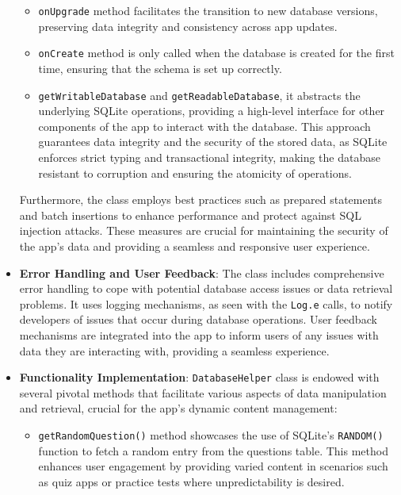 \documentclass[conference,10pt,letterpaper]{IEEEtran}
\begin{document}
\begin{itemize}
		\begin{itemize}
			\item \texttt{onUpgrade} method facilitates the transition to new database versions, preserving data integrity and consistency across app updates.
			
			\item  \texttt{onCreate} method is only called when the database is created for the first time, ensuring that the schema is set up correctly. 
			
			\item \texttt{getWritableDatabase} and \texttt{getReadableDatabase}, it abstracts the underlying SQLite operations, providing a high-level interface for other components of the app to interact with the database. This approach guarantees data integrity and the security of the stored data, as SQLite enforces strict typing and transactional integrity, making the database resistant to corruption and ensuring the atomicity of operations.
		\end{itemize}
		
		Furthermore, the class employs best practices such as prepared statements and batch insertions to enhance performance and protect against SQL injection attacks. These measures are crucial for maintaining the security of the app's data and providing a seamless and responsive user experience.
		
		\item \textbf{Error Handling and User Feedback}:
		The class includes comprehensive error handling to cope with potential database access issues or data retrieval problems. It uses logging mechanisms, as seen with the \texttt{Log.e} calls, to notify developers of issues that occur during database operations. User feedback mechanisms are integrated into the app to inform users of any issues with data they are interacting with, providing a seamless experience.
		
		\item \textbf{Functionality Implementation}:
		\texttt{DatabaseHelper} class is endowed with several pivotal methods that facilitate various aspects of data manipulation and retrieval, crucial for the app's dynamic content management:
		
		\begin{itemize}
			\item \texttt{getRandomQuestion()} method showcases the use of SQLite's \texttt{RANDOM()} function to fetch a random entry from the questions table. This method enhances user engagement by providing varied content in scenarios such as quiz apps or practice tests where unpredictability is desired.
			

\end{itemize}
\end{itemize}
\end{document}
